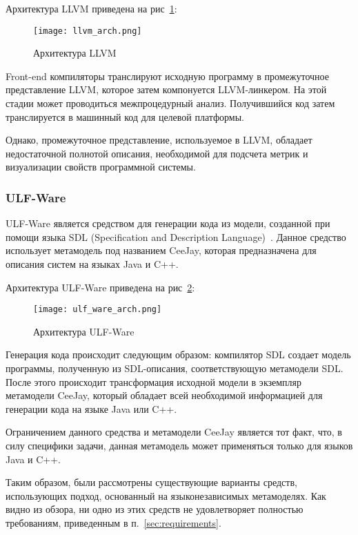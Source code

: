 Архитектура LLVM приведена на рис~\ref{fig:llvm_arch}:

\newpage

\begin{figure}[h!]
    \begin{center}
        \texttt{[image: llvm\_arch.png]}
    \end{center}
    \caption{Архитектура LLVM}
    \label{fig:llvm_arch}
\end{figure}

Front-end компиляторы транслируют исходную программу в промежуточное
представление LLVM, которое затем компонуется LLVM-линкером. На этой стадии
может проводиться межпроцедурный анализ. Получившийся код затем транслируется
в машинный код для целевой платформы.

Однако, промежуточное представление, используемое в LLVM, обладает
недостаточной полнотой описания, необходимой для подсчета метрик и визуализации
свойств программной системы.

\subsubsection{ULF-Ware}

ULF-Ware является средством для генерации кода из модели, созданной при помощи
языка SDL (Specification and Description Language)~\cite{metamodeling}. Данное
средство использует метамодель под названием CeeJay, которая предназначена для
описания систем на языках Java и C++.

Архитектура ULF-Ware приведена на рис~\ref{fig:ulf_ware_arch}:

\newpage

\begin{figure}[h!]
    \begin{center}
        \texttt{[image: ulf\_ware\_arch.png]}
    \end{center}
    \caption{Архитектура ULF-Ware}
    \label{fig:ulf_ware_arch}
\end{figure}

Генерация кода происходит следующим образом: компилятор SDL создает модель
программы, полученную из SDL-описания, соответствующую метамодели SDL. После
этого происходит трансформация исходной модели в экземпляр метамодели CeeJay,
который обладает всей необходимой информацией для генерации кода на языке Java
или C++.

Ограничением данного средства и метамодели CeeJay является тот факт, что, в силу
специфики задачи, данная метамодель может применяться только для языков Java и
C++.

Таким образом, были рассмотрены существующие варианты средств, использующих
подход, основанный на языконезависимых метамоделях. Как видно из обзора, ни одно
из этих средств не удовлетворяет полностью требованиям, приведенным в
п.~\ref{sec:requirements}.
